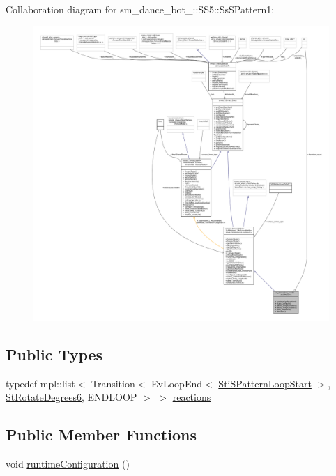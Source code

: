 Collaboration diagram for sm\+\_\+dance\+\_\+bot\+\_\+:\+:S\+S5\+:\+:Ss\+S\+Pattern1\+:
\nopagebreak
\begin{figure}[H]
\begin{center}
\leavevmode
\includegraphics[width=350pt]{structsm__dance__bot__3_1_1SS5_1_1SsSPattern1__coll__graph}
\end{center}
\end{figure}
\subsection*{Public Types}
\begin{DoxyCompactItemize}
\item 
typedef mpl\+::list$<$ Transition$<$ Ev\+Loop\+End$<$ \hyperlink{structsm__dance__bot__3_1_1s__pattern__states_1_1StiSPatternLoopStart}{Sti\+S\+Pattern\+Loop\+Start} $>$, \hyperlink{structsm__dance__bot__3_1_1StRotateDegrees6}{St\+Rotate\+Degrees6}, E\+N\+D\+L\+O\+OP $>$ $>$ \hyperlink{structsm__dance__bot__3_1_1SS5_1_1SsSPattern1_acd97c3196ef81bd22d028a3a735f430a}{reactions}
\end{DoxyCompactItemize}
\subsection*{Public Member Functions}
\begin{DoxyCompactItemize}
\item 
void \hyperlink{structsm__dance__bot__3_1_1SS5_1_1SsSPattern1_a833f3ef50898e9561a31a45615074afb}{runtime\+Configuration} ()
\end{DoxyCompactItemize}
